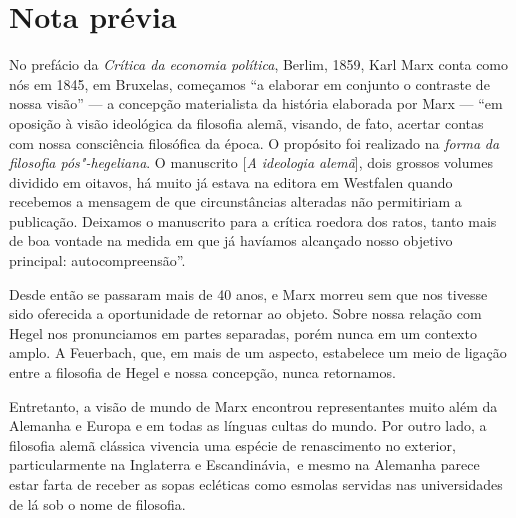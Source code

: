 {\let\clearpage\relax\chapter[Nota prévia]{Nota prévia\protect{}}}


\noindent{}No prefácio da \emph{Crítica da economia política}, Berlim, 1859,
Karl Marx conta como nós em 1845, em Bruxelas, começamos ``a elaborar em
conjunto o contraste de nossa visão'' --- a concepção materialista da
história elaborada por Marx --- ``em oposição à visão ideológica da %
filosofia alemã, visando, de fato, acertar contas com nossa consciência
filosófica da época. O propósito foi realizado na \emph{forma} \emph{da
filosofia pós"-hegeliana}. O manuscrito {[}\emph{A ideologia alemã}{]},
dois grossos volumes dividido em oitavos, há muito já estava na editora
em Westfalen quando recebemos a mensagem de que circunstâncias
alteradas não permitiriam a publicação. Deixamos o manuscrito para a
crítica roedora dos ratos, tanto mais de boa vontade na medida em que já
havíamos alcançado nosso objetivo principal: autocompreensão''.

Desde então se passaram mais de 40 anos, e Marx morreu sem que nos
tivesse sido oferecida a oportunidade de retornar ao objeto. Sobre nossa
relação com Hegel nos pronunciamos em partes separadas, porém nunca em
um contexto amplo. A Feuerbach, que, em mais de um aspecto, estabelece
um meio de ligação entre a filosofia de Hegel e nossa concepção, nunca
retornamos.

Entretanto, a visão de mundo de Marx encontrou representantes muito além
da Alemanha e Europa e em todas as línguas cultas do mundo. Por outro
lado, a filosofia alemã clássica vivencia uma espécie de renascimento no %
exterior, particularmente na Inglaterra e Escandinávia,\est\ e mesmo na
Alemanha parece estar farta de receber as sopas ecléticas como esmolas
servidas nas universidades de lá sob o nome de filosofia.

